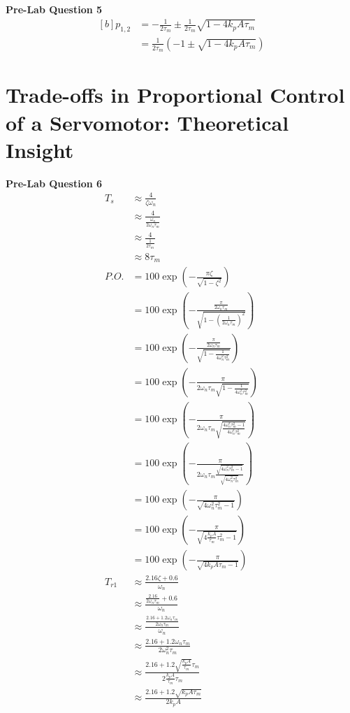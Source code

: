 \documentclass[12pt]{article}
\begin{document}
\textbf{Pre-Lab Question 5}
\begin{equation*}
\begin{aligned}[b]
    p_{1,2} &= -\frac{1}{2\tau_m} \pm \frac{1}{2\tau_m}\sqrt{1 - 4k_p A \tau_m} \\
    &= \frac{1}{2\tau_m} \left( -1 \pm \sqrt{1 - 4k_p A \tau_m} \right)
\end{aligned}
\end{equation*}

\section{Trade-offs in Proportional Control of a Servomotor: Theoretical Insight}
\textbf{Pre-Lab Question 6}
\begin{align*}
    T_s &\approx \frac{4}{\zeta\omega_n} \\
    &\approx \frac{4}{\frac{\omega_n}{2\omega_n\tau_m}} \\
    &\approx \frac{4}{\frac{1}{2\tau_m}} \\
    &\approx 8\tau_m \\
    P.O. &= 100\exp\left(-\frac{\pi\zeta}{\sqrt{1-\zeta^2}}\right) \\
    &= 100\exp\left(-\frac{\frac{\pi}{2\omega_n\tau_m}}{\sqrt{1-\left(\frac{1}{2\omega_n\tau_m}\right)^2}}\right) \\
    &= 100\exp\left(-\frac{\frac{\pi}{2\omega_n\tau_m}}{\sqrt{1-\frac{1}{4\omega_n^2\tau_m^2}}}\right) \\
    &= 100\exp\left(-\frac{\pi}{2\omega_n\tau_m\sqrt{1-\frac{1}{4\omega_n^2\tau_m^2}}}\right) \\
    &= 100\exp\left(-\frac{\pi}{2\omega_n\tau_m\sqrt{\frac{4\omega_n^2\tau_m^2 - 1}{4\omega_n^2\tau_m^2}}}\right) \\
    &= 100\exp\left(-\frac{\pi}{2\omega_n\tau_m\frac{\sqrt{4\omega_n^2\tau_m^2 - 1}}{\sqrt{4\omega_n^2\tau_m^2}}}\right) \\
    &= 100\exp\left(-\frac{\pi}{\sqrt{4\omega_n^2\tau_m^2 - 1}}\right) \\
    &= 100\exp\left(-\frac{\pi}{\sqrt{4\frac{k_pA}{\tau_m}\tau_m^2 - 1}}\right) \\
    &= 100\exp\left(-\frac{\pi}{\sqrt{4k_pA\tau_m - 1}}\right) \\
    T_{r1} &\approx \frac{2.16\zeta + 0.6}{\omega_n} \\
    &\approx \frac{\frac{2.16}{2\omega_n\tau_m} + 0.6}{\omega_n} \\
    &\approx \frac{\frac{2.16 + 1.2\omega_n\tau_m}{2\omega_n\tau_m}}{\omega_n} \\
    &\approx \frac{2.16 + 1.2\omega_n\tau_m}{2\omega_n^2\tau_m} \\
    &\approx \frac{2.16 + 1.2\sqrt{\frac{k_pA}{\tau_m}}\tau_m}{2\frac{k_pA}{\tau_m}\tau_m} \\
    &\approx \frac{2.16 + 1.2\sqrt{k_pA\tau_m}}{2k_pA} \\
\end{align*}
\end{document}
